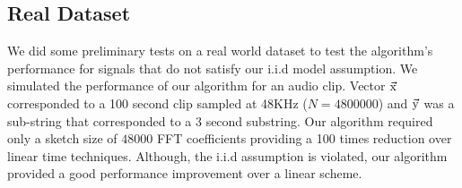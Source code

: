 \subsection{Real Dataset}
We did some preliminary tests on a real world dataset to test the algorithm's performance for signals that do not satisfy our i.i.d model assumption. We simulated the performance of our algorithm for an audio clip. Vector $\vec{\mathrm{x}}$ corresponded to a 100 second clip sampled at 48KHz ($N=4800000$) and $\vec{\mathrm{y}}$ was a sub-string that corresponded to a 3 second substring. Our algorithm required only a sketch size of $48000$ FFT coefficients providing a 100 times reduction over linear time techniques. Although, the i.i.d assumption is violated, our algorithm provided a good performance improvement over a linear scheme. 

 		